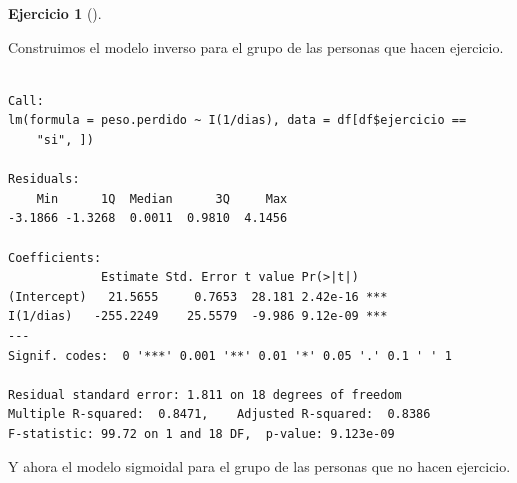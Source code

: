 \documentclass[
  a4paper,
]{scrreport}
\newenvironment{Shaded}{\begin{snugshade}}{\end{snugshade}}
\newcommand{\DecValTok}[1]{\textcolor[rgb]{0.68,0.00,0.00}{#1}}
\newcommand{\FunctionTok}[1]{\textcolor[rgb]{0.28,0.35,0.67}{#1}}
\newcommand{\NormalTok}[1]{\textcolor[rgb]{0.00,0.23,0.31}{#1}}
\newcommand{\OtherTok}[1]{\textcolor[rgb]{0.00,0.23,0.31}{#1}}
\newcommand{\SpecialCharTok}[1]{\textcolor[rgb]{0.37,0.37,0.37}{#1}}
\newcommand{\StringTok}[1]{\textcolor[rgb]{0.13,0.47,0.30}{#1}}
\theoremstyle{definition}
\newtheorem{exercise}{Ejercicio}[chapter]
\theoremstyle{remark}
\begin{document}
\begin{exercise}[]
\begin{enumerate}
  \begin{tcolorbox}[enhanced jigsaw, breakable, opacityback=0, colbacktitle=quarto-callout-tip-color!10!white, colframe=quarto-callout-tip-color-frame, left=2mm, titlerule=0mm, coltitle=black, colback=white, bottomtitle=1mm, toptitle=1mm, opacitybacktitle=0.6, title=\textcolor{quarto-callout-tip-color}{\faLightbulb}\hspace{0.5em}{Solución}, leftrule=.75mm, bottomrule=.15mm, toprule=.15mm, rightrule=.15mm, arc=.35mm]

  Construimos el modelo inverso para el grupo de las personas que hacen
  ejercicio.

\begin{Shaded}
\end{Shaded}

\begin{verbatim}

Call:
lm(formula = peso.perdido ~ I(1/dias), data = df[df$ejercicio == 
    "si", ])

Residuals:
    Min      1Q  Median      3Q     Max 
-3.1866 -1.3268  0.0011  0.9810  4.1456 

Coefficients:
             Estimate Std. Error t value Pr(>|t|)    
(Intercept)   21.5655     0.7653  28.181 2.42e-16 ***
I(1/dias)   -255.2249    25.5579  -9.986 9.12e-09 ***
---
Signif. codes:  0 '***' 0.001 '**' 0.01 '*' 0.05 '.' 0.1 ' ' 1

Residual standard error: 1.811 on 18 degrees of freedom
Multiple R-squared:  0.8471,    Adjusted R-squared:  0.8386 
F-statistic: 99.72 on 1 and 18 DF,  p-value: 9.123e-09
\end{verbatim}

  Y ahora el modelo sigmoidal para el grupo de las personas que no hacen
  ejercicio.

\begin{Shaded}
\end{Shaded}


\end{tcolorbox}
\end{enumerate}
\end{exercise}
\end{document}
